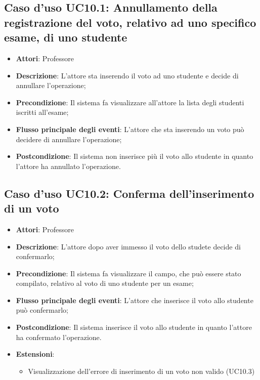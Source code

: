 \subsection{Caso d'uso \texorpdfstring{UC10.1}{UC10.1}: Annullamento della registrazione del voto, relativo ad uno specifico esame, di uno studente}
\begin{itemize}
\item \textbf{Attori}: Professore
\item \textbf{Descrizione}: L'attore sta inserendo il voto ad uno studente e decide di annullare l'operazione;
\item \textbf{Precondizione}: Il sistema fa visualizzare all'attore la lista degli studenti iscritti all'esame;

\item \textbf{Flusso principale degli eventi}: L'attore che sta inserendo un voto può decidere di annullare l'operazione;
\item \textbf{Postcondizione}: Il sistema non inserisce più il voto allo studente in quanto l'attore ha annullato l'operazione.

\end{itemize}
\subsection{Caso d'uso \texorpdfstring{UC10.2}{UC10.2}: Conferma dell'inserimento di un voto}
\begin{itemize}
\item \textbf{Attori}: Professore
\item \textbf{Descrizione}: L'attore dopo aver immesso il voto dello studete decide di confermarlo;
\item \textbf{Precondizione}: Il sistema fa visualizzare il campo, che può essere stato compilato, relativo al voto di uno studente per un esame;
\item \textbf{Flusso principale degli eventi}: L'attore che inserisce il voto allo studente può confermarlo;
\item \textbf{Postcondizione}: Il sistema inserisce il voto allo studente in quanto l'attore ha confermato l'operazione.
\item \textbf{Estensioni}:
\begin{itemize}
\item Visualizzazione dell'errore di inserimento di un voto non valido (UC10.3)
\end{itemize}
\end{itemize}
